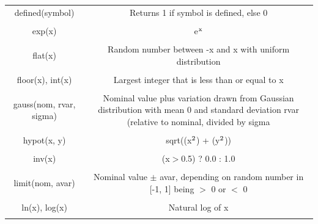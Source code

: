 \begin{longtable}{c c}
defined(symbol) & \begin{minipage}{20em}
Returns 1 if symbol is defined, else 0
\end{minipage}\\ \\

exp(x) & \begin{minipage}{20em}
e$\rm{^x}$
\end{minipage}\\ \\

flat(x) & \begin{minipage}{20em}
Random number between -x and x with uniform distribution
\end{minipage}\\ \\

floor(x), int(x) & \begin{minipage}{20em}
Largest integer that is less than or equal to x
\end{minipage}\\ \\

gauss(nom, rvar, sigma) & \begin{minipage}{20em}
Nominal value plus variation drawn from Gaussian distribution with mean 0 and standard deviation rvar (relative to nominal, divided by sigma
\end{minipage}\\ \\

hypot(x, y) & \begin{minipage}{20em}
sqrt((x$\rm{^2}$) + (y$\rm{^2}$))
\end{minipage}\\ \\

inv(x) & \begin{minipage}{20em}
(x$>$0.5) ? 0.0 : 1.0
\end{minipage}\\ \\

limit(nom, avar) & \begin{minipage}{20em}
Nominal value $\pm$ avar, depending on random number in [-1, 1] being $>$ 0 or $<$ 0
\end{minipage}\\ \\

ln(x), log(x) & \begin{minipage}{20em}
Natural log of x
\end{minipage}\\ \\


\end{longtable}
